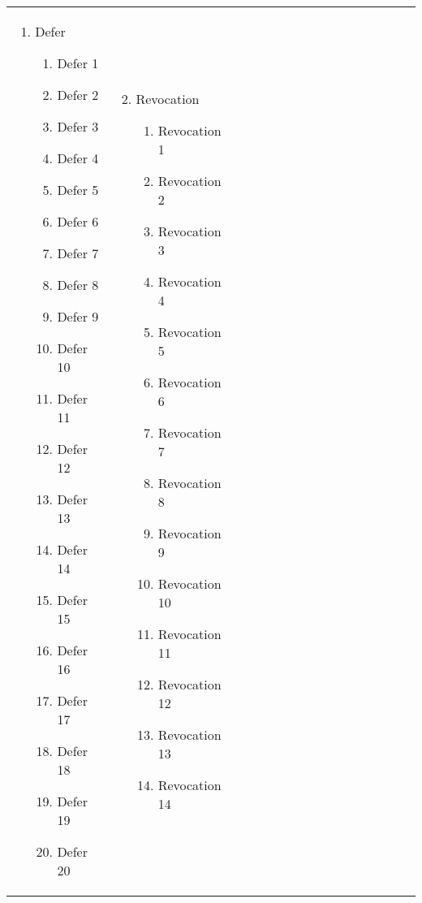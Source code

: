 \renewcommand{\labelenumii}{\arabic{enumii}.}
\begin{tabular}{@{} p{0.25\linewidth} p{0.25\linewidth} p{0.25\linewidth} p{0.25\linewidth}}
\begin{enumerate}
	\item Defer
	\begin{enumerate}
		\item Defer 1
		\item Defer 2
		\item Defer 3
		\item Defer 4
		\item Defer 5
		\item Defer 6
		\item Defer 7
		\item Defer 8
		\item Defer 9
		\item Defer 10
		\item Defer 11
		\item Defer 12
		\item Defer 13
		\item Defer 14
		\item Defer 15
		\item Defer 16
		\item Defer 17
		\item Defer 18
		\item Defer 19
		\item Defer 20
	\end{enumerate}
\end{enumerate} &
\begin{enumerate}
	\setcounter{enumi}{1}
	\item Revocation
	\begin{enumerate}
		\item Revocation 1
		\item Revocation 2
		\item Revocation 3
		\item Revocation 4
		\item Revocation 5
		\item Revocation 6
		\item Revocation 7
		\item Revocation 8
		\item Revocation 9
		\item Revocation 10
		\item Revocation 11
		\item Revocation 12
		\item Revocation 13
		\item Revocation 14

\end{enumerate}
\end{enumerate}
\end{tabular}
